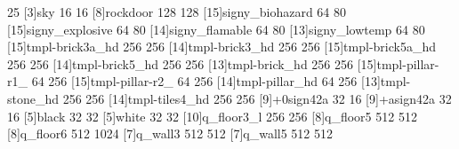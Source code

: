 25
[3]sky 16 16
[8]rockdoor 128 128
[15]signy_biohazard 64 80
[15]signy_explosive 64 80
[14]signy_flamable 64 80
[13]signy_lowtemp 64 80
[15]tmpl-brick3a_hd 256 256
[14]tmpl-brick3_hd 256 256
[15]tmpl-brick5a_hd 256 256
[14]tmpl-brick5_hd 256 256
[13]tmpl-brick_hd 256 256
[15]tmpl-pillar-r1_ 64 256
[15]tmpl-pillar-r2_ 64 256
[14]tmpl-pillar_hd 64 256
[13]tmpl-stone_hd 256 256
[14]tmpl-tiles4_hd 256 256
[9]+0sign42a 32 16
[9]+asign42a 32 16
[5]black 32 32
[5]white 32 32
[10]q_floor3_l 256 256
[8]q_floor5 512 512
[8]q_floor6 512 1024
[7]q_wall3 512 512
[7]q_wall5 512 512

